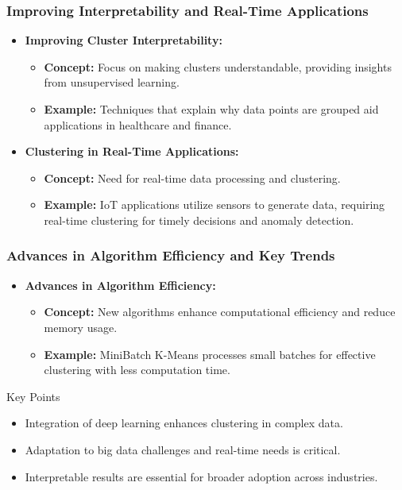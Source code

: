\documentclass[aspectratio=169]{beamer}
\begin{document}
\begin{frame}[fragile]
    \frametitle{Improving Interpretability and Real-Time Applications}
    \begin{itemize}
        \item \textbf{Improving Cluster Interpretability:}
        \begin{itemize}
            \item \textbf{Concept:} Focus on making clusters understandable, providing insights from unsupervised learning.
            \item \textbf{Example:} Techniques that explain why data points are grouped aid applications in healthcare and finance.
        \end{itemize}
        
        \item \textbf{Clustering in Real-Time Applications:}
        \begin{itemize}
            \item \textbf{Concept:} Need for real-time data processing and clustering.
            \item \textbf{Example:} IoT applications utilize sensors to generate data, requiring real-time clustering for timely decisions and anomaly detection.
        \end{itemize}
    \end{itemize}
\end{frame}

\begin{frame}[fragile]
    \frametitle{Advances in Algorithm Efficiency and Key Trends}
    \begin{itemize}
        \item \textbf{Advances in Algorithm Efficiency:}
        \begin{itemize}
            \item \textbf{Concept:} New algorithms enhance computational efficiency and reduce memory usage.
            \item \textbf{Example:} MiniBatch K-Means processes small batches for effective clustering with less computation time.
        \end{itemize}
    \end{itemize}
    
    \begin{block}{Key Points}
        \begin{itemize}
            \item Integration of deep learning enhances clustering in complex data.
            \item Adaptation to big data challenges and real-time needs is critical.
            \item Interpretable results are essential for broader adoption across industries.
        \end{itemize}
    \end{block}
\end{frame}
\end{document}
